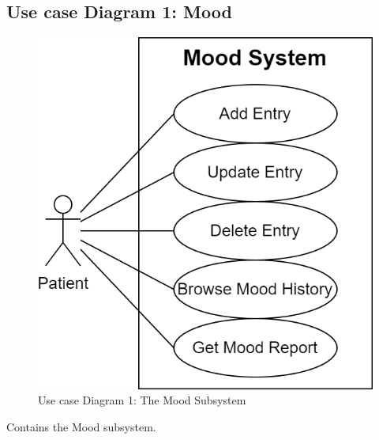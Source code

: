 \documentclass[11pt]{article}
\begin{document}
    \subsection{Use case Diagram 1: Mood}\label{subsec:use-case-diagram-1:-Mood}
    \begin{figure}[H]
        \centering
        \includegraphics[height=0.3\textheight]{Diagrams/Use Case Diagrams/Use Case Diagram 1}
        \caption{Use case Diagram 1: The Mood Subsystem}
        \label{fig:Use case Diagram 1: The Mood Subsystem}
    \end{figure}

    Contains the Mood subsystem.
\end{document}
